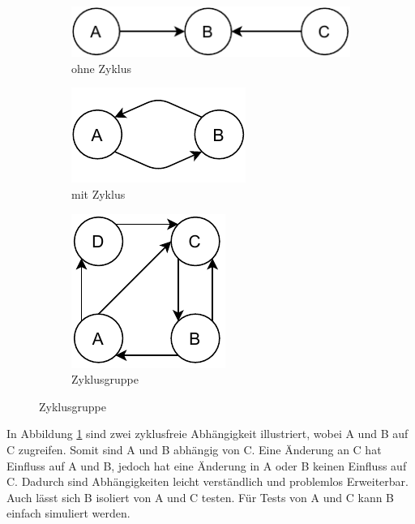 \begin{figure}[H]
    \centering
    \caption{Beispiele für Abhängigkeiten basierend auf Lilienthal}
    \label{fig:exampleCircular}
    \begin{subfigure}[b]{.3\textwidth}
        \centering
        \includegraphics[width=.9\textwidth]{diagrams/Methoden/Circular-Example-C.pdf}
        \caption{ohne Zyklus}
        \label{fig:circularA}
    \end{subfigure}
    \begin{subfigure}[b]{.3\textwidth}
        \centering
        \includegraphics[width=.6\textwidth]{diagrams/Methoden/Circular-Example-A.pdf}
        \caption{mit Zyklus}
        \label{fig:circularB}
    \end{subfigure}
    \begin{subfigure}[b]{.3\textwidth}
        \centering
        \includegraphics[width=.5\textwidth]{diagrams/Methoden/Circular-Example-B.pdf}
        \caption{Zyklusgruppe}
        \label{fig:circularC}
    \end{subfigure}
\end{figure}
In Abbildung \ref{fig:circularA} sind zwei zyklusfreie Abhängigkeit illustriert, wobei A und B auf C zugreifen. Somit sind A und B abhängig von C. Eine Änderung an C hat Einfluss auf A und B, jedoch hat eine Änderung in A oder B keinen Einfluss auf C. Dadurch sind Abhängigkeiten leicht verständlich und problemlos Erweiterbar. 
Auch lässt sich B isoliert von A und C testen. Für Tests von A und C kann B einfach simuliert werden.

